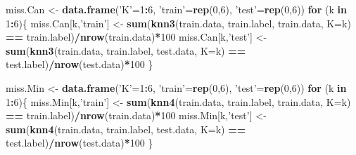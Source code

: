 \documentclass[
]{article}
\newenvironment{Shaded}{\begin{snugshade}}{\end{snugshade}}
\newcommand{\ControlFlowTok}[1]{\textcolor[rgb]{0.13,0.29,0.53}{\textbf{#1}}}
\newcommand{\DataTypeTok}[1]{\textcolor[rgb]{0.13,0.29,0.53}{#1}}
\newcommand{\DecValTok}[1]{\textcolor[rgb]{0.00,0.00,0.81}{#1}}
\newcommand{\KeywordTok}[1]{\textcolor[rgb]{0.13,0.29,0.53}{\textbf{#1}}}
\newcommand{\NormalTok}[1]{#1}
\newcommand{\OperatorTok}[1]{\textcolor[rgb]{0.81,0.36,0.00}{\textbf{#1}}}
\newcommand{\StringTok}[1]{\textcolor[rgb]{0.31,0.60,0.02}{#1}}
\begin{document}
\begin{Shaded}
\begin{Highlighting}[]
\NormalTok{miss.Can <-}\StringTok{ }\KeywordTok{data.frame}\NormalTok{(}\StringTok{'K'}\NormalTok{=}\DecValTok{1}\OperatorTok{:}\DecValTok{6}\NormalTok{, }\StringTok{'train'}\NormalTok{=}\KeywordTok{rep}\NormalTok{(}\DecValTok{0}\NormalTok{,}\DecValTok{6}\NormalTok{), }\StringTok{'test'}\NormalTok{=}\KeywordTok{rep}\NormalTok{(}\DecValTok{0}\NormalTok{,}\DecValTok{6}\NormalTok{))}
\ControlFlowTok{for}\NormalTok{ (k }\ControlFlowTok{in} \DecValTok{1}\OperatorTok{:}\DecValTok{6}\NormalTok{)\{}
\NormalTok{    miss.Can[k,}\StringTok{'train'}\NormalTok{] <-}\StringTok{ }\KeywordTok{sum}\NormalTok{(}\KeywordTok{knn3}\NormalTok{(train.data, train.label, train.data, }\DataTypeTok{K=}\NormalTok{k) }\OperatorTok{==}\StringTok{ }\NormalTok{train.label)}\OperatorTok{/}\KeywordTok{nrow}\NormalTok{(train.data)}\OperatorTok{*}\DecValTok{100}
\NormalTok{    miss.Can[k,}\StringTok{'test'}\NormalTok{] <-}\StringTok{  }\KeywordTok{sum}\NormalTok{(}\KeywordTok{knn3}\NormalTok{(train.data, train.label, test.data, }\DataTypeTok{K=}\NormalTok{k)  }\OperatorTok{==}\StringTok{ }\NormalTok{test.label)}\OperatorTok{/}\KeywordTok{nrow}\NormalTok{(test.data)}\OperatorTok{*}\DecValTok{100}
\NormalTok{\}}

\NormalTok{miss.Min <-}\StringTok{ }\KeywordTok{data.frame}\NormalTok{(}\StringTok{'K'}\NormalTok{=}\DecValTok{1}\OperatorTok{:}\DecValTok{6}\NormalTok{, }\StringTok{'train'}\NormalTok{=}\KeywordTok{rep}\NormalTok{(}\DecValTok{0}\NormalTok{,}\DecValTok{6}\NormalTok{), }\StringTok{'test'}\NormalTok{=}\KeywordTok{rep}\NormalTok{(}\DecValTok{0}\NormalTok{,}\DecValTok{6}\NormalTok{))}
\ControlFlowTok{for}\NormalTok{ (k }\ControlFlowTok{in} \DecValTok{1}\OperatorTok{:}\DecValTok{6}\NormalTok{)\{}
\NormalTok{    miss.Min[k,}\StringTok{'train'}\NormalTok{] <-}\StringTok{ }\KeywordTok{sum}\NormalTok{(}\KeywordTok{knn4}\NormalTok{(train.data, train.label, train.data, }\DataTypeTok{K=}\NormalTok{k) }\OperatorTok{==}\StringTok{ }\NormalTok{train.label)}\OperatorTok{/}\KeywordTok{nrow}\NormalTok{(train.data)}\OperatorTok{*}\DecValTok{100}
\NormalTok{    miss.Min[k,}\StringTok{'test'}\NormalTok{] <-}\StringTok{  }\KeywordTok{sum}\NormalTok{(}\KeywordTok{knn4}\NormalTok{(train.data, train.label, test.data, }\DataTypeTok{K=}\NormalTok{k)  }\OperatorTok{==}\StringTok{ }\NormalTok{test.label)}\OperatorTok{/}\KeywordTok{nrow}\NormalTok{(test.data)}\OperatorTok{*}\DecValTok{100}
\NormalTok{\}}
\end{Highlighting}
\end{Shaded}
\end{document}
